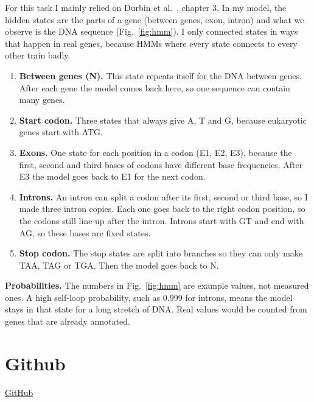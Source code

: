 \documentclass[10pt,a4paper]{article}
\begin{document}
For this task I mainly relied on Durbin et al.~\cite{durbin1998}, chapter 3. In my model,
the hidden states are the parts of a gene (between genes, exon, intron) and what we observe
is the DNA sequence (Fig.~\ref{fig:hmm}). I only connected states in ways that happen in
real genes, because HMMs where every state connects to every other train badly.
\begin{enumerate}
\item \textbf{Between genes (N).} This state repeats itself for the DNA between genes. After
  each gene the model comes back here, so one sequence can contain many genes.
\item \textbf{Start codon.} Three states that always give A, T and G, because eukaryotic
  genes start with ATG.
\item \textbf{Exons.} One state for each position in a codon (E1, E2, E3), because the first,
  second and third bases of codons have different base frequencies. After E3 the model goes
  back to E1 for the next codon.
\item \textbf{Introns.} An intron can split a codon after its first, second or third base,
  so I made three intron copies. Each one goes back to the right codon position, so the
  codons still line up after the intron. Introns start with GT and end with AG, so these
  bases are fixed states.
\item \textbf{Stop codon.} The stop states are split into branches so they can only make
  TAA, TAG or TGA. Then the model goes back to N.
\end{enumerate}

\textbf{Probabilities.} The numbers in Fig.~\ref{fig:hmm} are example values, not measured
ones. A high self-loop probability, such as 0.999 for introns, means the model stays in that
state for a long stretch of DNA. Real values would be counted from genes that are already
annotated.

\section{Github}
\href{https://github.com/ChlorIdas/homework_1_BSA}{GitHub}    



\end{document}
